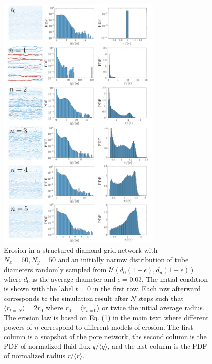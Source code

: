 \documentclass[%
 amsmath,amssymb,
prstper,
]{revtex4-2}
\begin{document}
%
\begin{figure}[htp]
 \includegraphics[width=0.72\textwidth]{FigS4.pdf}
     \caption{Erosion in a structured diamond grid network with $N_x=50, N_y=50$ and an initially narrow distribution of tube diameters randomly sampled from  $\mathcal{U}\left(d_0(1-\epsilon), d_u(1+\epsilon)\right) $ where  $d_0$ is the average diameter and $\epsilon=0.03$. The initial condition is shown with the label $t=0$ in the first row. Each row afterward corresponds to the simulation result after $N$ steps such that $\langle r_{t=N}\rangle=2r_0$ where $r_0 = \langle r_{t=0}\rangle$ or twice the initial average radius. The erosion law is based on Eq. (1) in the main text where different powers of $n$ correspond to different models of erosion. The first column is a snapshot of the pore network, the second column is the PDF of normalized fluid flux $q/\langle q \rangle$, and the last column is the PDF of normalized radius $r/\langle r\rangle$.}\label{fig:fig2}%
\end{figure}




\newpage 
\newpage 
\newpage
\end{document}
